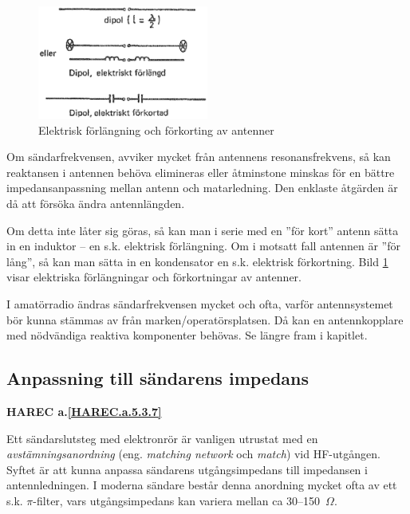 \begin{figure}
  \includegraphics[width=0.5\textwidth]{images/cropped_pdfs/bild_2_6-04.pdf}
  \caption{Elektrisk förlängning och förkorting av antenner}
  \label{fig:bildII6-4}
\end{figure}

Om sändarfrekvensen, avviker mycket från antennens resonansfrekvens,
så kan reaktansen i antennen behöva elimineras eller åtminstone
minskas för en bättre impedansanpassning mellan antenn och matarledning.
Den enklaste åtgärden är då att försöka ändra antennlängden.

Om detta inte låter sig göras, så kan man i serie med en ''för kort''
antenn sätta in en induktor -- en s.k. elektrisk förlängning.
Om i motsatt fall antennen är ''för lång'', så kan man sätta in en
kondensator en s.k. elektrisk förkortning.
Bild \ref{fig:bildII6-4} visar elektriska förlängningar och förkortningar av
antenner.

I amatörradio ändras sändarfrekvensen mycket och ofta, varför
antennsystemet bör kunna stämmas av från marken/operatörsplatsen.
Då kan en antennkopplare med nödvändiga reaktiva komponenter behövas.
Se längre fram i kapitlet.

\subsection{Anpassning till sändarens impedans}
\textbf{
HAREC a.\ref{HAREC.a.5.3.7}\label{myHAREC.a.5.3.7}
}

Ett sändarslutsteg med elektronrör är vanligen utrustat med en
\emph{avstämningsanordning} (eng. \emph{matching network} och \emph{match})
vid HF-utgången.
Syftet är att kunna anpassa sändarens utgångsimpedans till impedansen i
antennledningen.
I moderna sändare består denna anordning mycket ofta av ett s.k.
\(\pi \)-filter, vars utgångsimpedans kan variera mellan ca 30--150~\(\Omega\).

